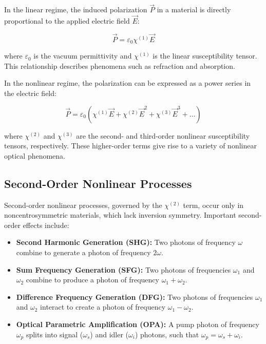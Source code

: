 \noindent In the linear regime, the induced polarization $\vec{P}$ in a material is directly proportional to the applied electric field $\vec{E}$:

\begin{equation}
	\vec{P} = \varepsilon_0 \chi^{(1)} \vec{E}
	\label{eq:linear_polarization}
\end{equation}

\noindent where $\varepsilon_0$ is the vacuum permittivity and $\chi^{(1)}$ is the linear susceptibility tensor. This relationship describes phenomena such as refraction and absorption.

\noindent In the nonlinear regime, the polarization can be expressed as a power series in the electric field:

\begin{equation}
	\vec{P} = \varepsilon_0 (\chi^{(1)} \vec{E} + \chi^{(2)} \vec{E}^2 + \chi^{(3)} \vec{E}^3 + \ldots)
	\label{eq:nonlinear_polarization}
\end{equation}

\noindent where $\chi^{(2)}$ and $\chi^{(3)}$ are the second- and third-order nonlinear susceptibility tensors, respectively. These higher-order terms give rise to a variety of nonlinear optical phenomena.

\subsection{Second-Order Nonlinear Processes}
\label{subsec:second_order}

\noindent Second-order nonlinear processes, governed by the $\chi^{(2)}$ term, occur only in noncentrosymmetric materials, which lack inversion symmetry. Important second-order effects include:

\begin{itemize}
	\item \textbf{Second Harmonic Generation (SHG):} Two photons of frequency $\omega$ combine to generate a photon of frequency $2\omega$.
	\item \textbf{Sum Frequency Generation (SFG):} Two photons of frequencies $\omega_1$ and $\omega_2$ combine to produce a photon of frequency $\omega_1 + \omega_2$.
	\item \textbf{Difference Frequency Generation (DFG):} Two photons of frequencies $\omega_1$ and $\omega_2$ interact to create a photon of frequency $\omega_1 - \omega_2$.
	\item \textbf{Optical Parametric Amplification (OPA):} A pump photon of frequency $\omega_p$ splits into signal ($\omega_s$) and idler ($\omega_i$) photons, such that $\omega_p = \omega_s + \omega_i$.
\end{itemize}

